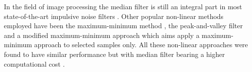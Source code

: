 


In the field of image processing the median filter is still an integral part in most state-of-the-art impulsive noise filters \cite{Alajlan2004}. Other popular non-linear methods employed have been the maximum-minimum method \cite{Xu1998}, the peak-and-valley filter\linebreak[2]\cite{Windyga2001} and a modified maximum-minimum approach \cite{Alajlan2004} which aims \DIFaddbegin {}\DIFaddend apply a maximum-minimum approach to selected samples only. All these non-linear approaches were found to have similar performance but with \DIFaddbegin {}\DIFaddend median filter bearing a higher computational cost \cite{Alajlan2004}.

